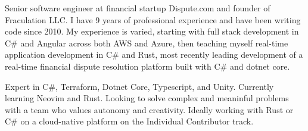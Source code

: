 

\begin{cvparagraph}

Senior software engineer at financial startup Dispute.com and founder of Fraculation LLC.\@
I have 9 years of professional experience and have been writing code since 2010. My experience is varied, starting with 
full stack development in C\# and Angular across both AWS and Azure, then teaching myself real-time application development in C\# and Rust,
most recently leading development of a real-time financial dispute resolution platform built with C\# and dotnet core.

Expert in C\#, Terraform, Dotnet Core, Typescript, and Unity. Currently learning Neovim and Rust. 
Looking to solve complex and meaninful problems with a team who values autonomy and creativity.
Ideally working with Rust or C\# on a cloud-native platform on the Individual Contributor track.

\end{cvparagraph}
